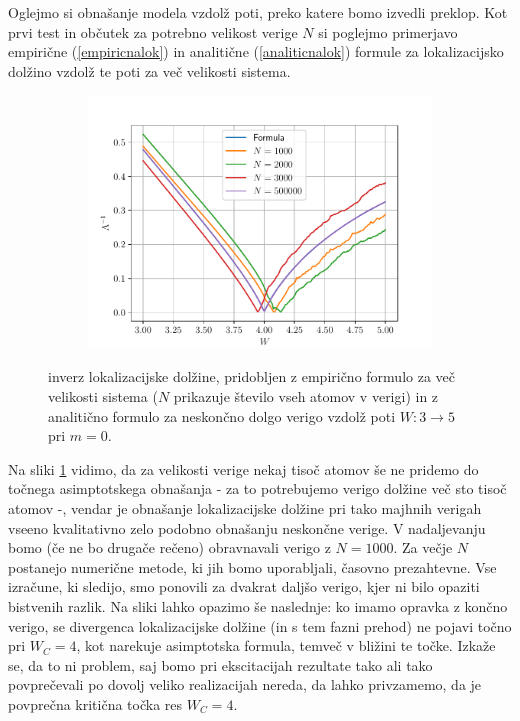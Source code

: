 Oglejmo si obnašanje modela vzdolž poti, preko katere bomo izvedli preklop. 
Kot prvi test in občutek za potrebno velikost verige $N$ si poglejmo primerjavo empirične (\ref{empiricnalok}) in analitične (\ref{analiticnalok}) formule za lokalizacijsko dolžino vzdolž te poti za več velikosti sistema.
\begin{figure}[!h]
\centering
\begin{subfigure}{.9\textwidth}
\includegraphics[width=\linewidth]{Figures/locLength.pdf}
\end{subfigure}
\caption{inverz lokalizacijske dolžine, pridobljen z empirično formulo za več velikosti sistema ($N$ prikazuje število vseh atomov v verigi) in z analitično formulo za neskončno dolgo verigo vzdolž poti $W: 3 \to 5$ pri $m=0$.}
\label{fig:locLength}
\end{figure}
Na sliki \ref{fig:locLength} vidimo, da za velikosti verige nekaj tisoč atomov še ne pridemo do točnega asimptotskega obnašanja - za to potrebujemo verigo dolžine več sto tisoč atomov -, vendar je obnašanje lokalizacijske dolžine pri tako majhnih verigah vseeno kvalitativno zelo podobno obnašanju neskončne verige. V nadaljevanju bomo (če ne bo drugače rečeno) obravnavali verigo z $N=1000$. Za večje $N$ postanejo numerične metode, ki jih bomo uporabljali, časovno prezahtevne. Vse izračune, ki sledijo, smo ponovili za dvakrat daljšo verigo, kjer ni bilo opaziti bistvenih razlik. Na sliki lahko opazimo še naslednje: ko imamo opravka z končno verigo, se divergenca lokalizacijske dolžine (in s tem fazni prehod) ne pojavi točno pri $W_C=4$, kot narekuje asimptotska formula, temveč v bližini te točke. Izkaže se, da to ni problem, saj bomo pri ekscitacijah rezultate tako ali tako povprečevali po dovolj veliko realizacijah nereda, da lahko privzamemo, da je povprečna kritična točka res $W_C=4$.

